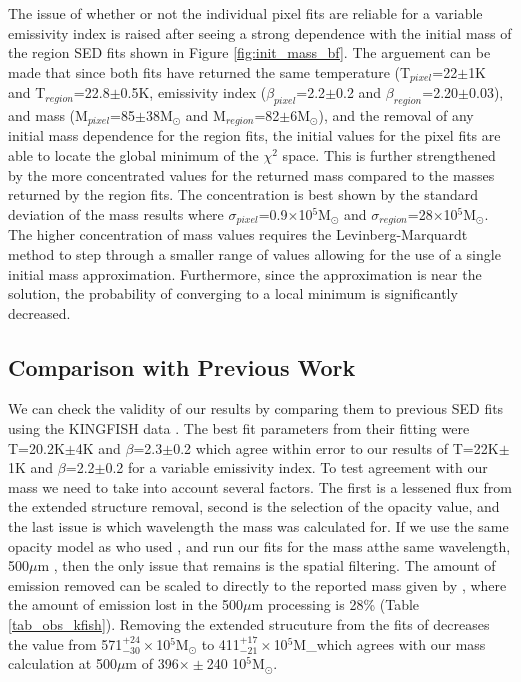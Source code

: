 The issue of whether or not the individual pixel fits are reliable for a variable emissivity index is raised after seeing a strong dependence with the initial mass of the region SED fits shown in Figure \ref{fig:init_mass_bf}.  The arguement can be made that since both fits have returned the same temperature (T$_{pixel}$=22$\pm$1K and T$_{region}$=22.8$\pm$0.5K, emissivity index ($\beta_{pixel}$=2.2$\pm$0.2 and $\beta_{region}$=2.20$\pm$0.03), and mass (M$_{pixel}$=85$\pm$38M$_\odot$ and M$_{region}$=82$\pm$6M$_\odot$), and the removal of any initial mass dependence for the region fits, the initial values for the pixel fits are able to locate the global minimum of the $\chi^2$ space.  This is further strengthened by the more concentrated values for the returned mass compared to the masses returned by the region fits.  The concentration is best shown by the standard deviation of the mass results where $\sigma_{pixel}$=0.9$\times$10$^5$M$_\odot$ and $\sigma_{region}$=28$\times$10$^5$M$_\odot$.  The higher concentration of mass values requires the Levinberg-Marquardt method to step through a smaller range of values allowing for the use of a single initial mass approximation.  Furthermore, since the approximation is near the solution, the probability of converging to a local minimum is significantly decreased.  

\subsection{Comparison with Previous Work}

We can check the validity of our results by comparing them to previous SED fits using the KINGFISH data \citep{galametz2012}.  The best fit parameters from their fitting were T=20.2K$\pm$4K and $\beta$=2.3$\pm$0.2 which agree within error to our results of T=22K$\pm$1K and $\beta$=2.2$\pm$0.2 for a variable emissivity index.  To test agreement with our mass we need to take into account several factors.  The first is a lessened flux from the extended structure removal, second is the selection of the opacity value, and the last issue is which wavelength the mass was calculated for.  If we use the same opacity model as \cite{galametz2012} who used \cite{li2001}, and run our fits for the mass atthe same wavelength, 500$\mu$m , then the only issue that remains is the spatial filtering.  The amount of emission removed can be scaled to directly to the reported mass given by \cite{galametz2012}, where the amount of emission lost in the 500$\mu$m processing is 28\% (Table \ref{tab_obs_kfish}).  Removing the extended strucuture from the fits of \cite{galametz2012} decreases the value from 571$^{+24}_{-30}\times$10$^5$M$_\odot$ to 411$^{+17}_{-21}\times$10$^5$M_\odot which agrees with our mass calculation at 500$\mu$m of 396$\times\pm$240 10$^5$M$_\odot$.

